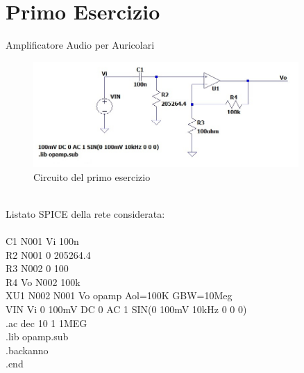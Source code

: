 \section{Primo Esercizio}\label{sec:primoEsercizio} 
Amplificatore Audio per Auricolari
\begin{figure}[h]
    \centering
    \includegraphics[width=0.9\textwidth]{Figure/Circuito1.jpg}
    \caption{Circuito del primo esercizio}
    \label{fig:Circuito1}
\end{figure}\\
Listato SPICE della rete considerata:\\
\\
C1 N001 Vi 100n\\
R2 N001 0 205264.4\\
R3 N002 0 100\\
R4 Vo N002 100k\\
XU1 N002 N001 Vo opamp Aol=100K GBW=10Meg\\
VIN Vi 0 100mV DC 0 AC 1 SIN(0 100mV 10kHz 0 0 0)\\
.ac dec 10 1 1MEG\\
.lib opamp.sub\\
.backanno\\
.end\\
